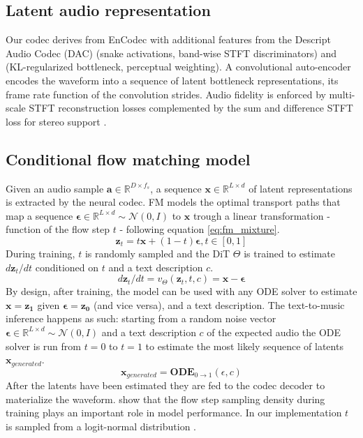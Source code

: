\subsection{Latent audio representation}

Our codec derives from EnCodec \citep{defossez2022high} with additional features from the Descript Audio Codec (DAC) \citep{kumar2024high} (snake activations, band-wise STFT discriminators) and \citet{evans2024fast} (KL-regularized bottleneck, perceptual weighting).
A convolutional auto-encoder encodes the waveform into a sequence of latent bottleneck representations, its frame rate function of the convolution strides.
Audio fidelity is enforced by multi-scale STFT reconstruction losses complemented by the sum and difference STFT loss for stereo support \citep{steinmetz2020automatic}.

\subsection{Conditional flow matching model}
Given an audio sample $\mathbf{a}\in\mathbb{R}^{D\times f_s}$, a sequence $\mathbf{x}\in\mathbb{R}^{L\times d}$ of latent representations is extracted by the neural codec.
FM models the optimal transport paths that map a sequence $\mathbf{\epsilon}\in\mathbb{R}^{L\times d}\sim\mathcal{N}(0,I)$ to $\mathbf{x}$ trough a linear transformation - function of the flow step $t$ - following equation \ref{eq:fm_mixture}.
\[\mathbf{z}_t=t\mathbf{x} + (1-t)\mathbf{\epsilon}, t \in [0,1]\label{eq:fm_mixture}\]
During training, $t$ is randomly sampled and the DiT $\Theta$ is trained to estimate $d\mathbf{z}_t/dt$ conditioned on $t$ and a text description $c$.
\[d\mathbf{z}_t/dt=v_{\Theta}(\mathbf{z}_t,t,c)=\mathbf{x}-\mathbf{\epsilon}\]
By design, after training, the model can be used with any ODE solver to estimate $\mathbf{x}=\mathbf{z_1}$ given $\mathbf{\epsilon}=\mathbf{z_0}$ (and vice versa), and a text description.
The text-to-music inference happens as such: starting from a random noise vector $\mathbf{\epsilon}\in\mathbb{R}^{L\times d}\sim\mathcal{N}(0,I)$ and a text description $c$ of the expected audio the ODE solver is run from $t=0$ to $t=1$ to estimate the most likely sequence of latents $\mathbf{x}_{generated}$.
\[\mathbf{x}_{generated}=\textbf{ODE}_{0\xrightarrow{}1}(\epsilon,c)\]
After the latents have been estimated they are fed to the codec decoder to materialize the waveform.
\citet{kingma2024understanding} show that the flow step sampling density during training plays an important role in model performance.
In our implementation $t$ is sampled from a logit-normal distribution \citep{karras2022elucidating,esser2024scaling}.

